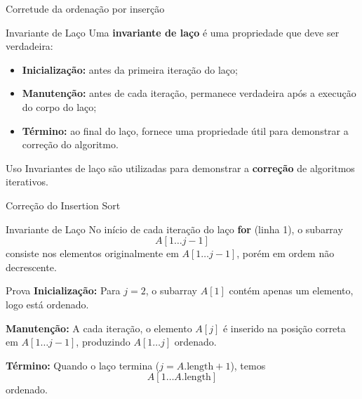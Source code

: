 \documentclass{beamer}
\begin{document}
\begin{frame}{Corretude da ordenação por inserção}

\begin{block}{Invariante de Laço}
Uma \textbf{invariante de laço} é uma propriedade que deve ser verdadeira:
\begin{itemize}
    \item \textbf{Inicialização:} antes da primeira iteração do laço;
    \item \textbf{Manutenção:} antes de cada iteração, permanece verdadeira após a execução do corpo do laço;
    \item \textbf{Término:} ao final do laço, fornece uma propriedade útil para demonstrar a correção do algoritmo.
\end{itemize}
\end{block}

\vspace{0.3cm}

\begin{alertblock}{Uso}
Invariantes de laço são utilizadas para demonstrar a \textbf{correção} de algoritmos iterativos.
\end{alertblock}

\end{frame}
\begin{frame}{Correção do Insertion Sort}

\begin{block}{Invariante de Laço}
No início de cada iteração do laço \textbf{for} (linha 1), o subarray
\[
A[1 \dots j-1]
\]
consiste nos elementos originalmente em $A[1 \dots j-1]$, porém em ordem não decrescente.
\end{block}

\begin{block}{Prova}
\textbf{Inicialização:}  
Para $j = 2$, o subarray $A[1]$ contém apenas um elemento, logo está ordenado.

\vspace{0.2cm}

\textbf{Manutenção:}  
A cada iteração, o elemento $A[j]$ é inserido na posição correta em $A[1 \dots j-1]$, produzindo $A[1 \dots j]$ ordenado.

\vspace{0.2cm}

\textbf{Término:}  
Quando o laço termina ($j = A.\text{length} + 1$), temos
\[
A[1 \dots A.\text{length}]
\]
ordenado.
\end{block}

\end{frame}
\end{document}
